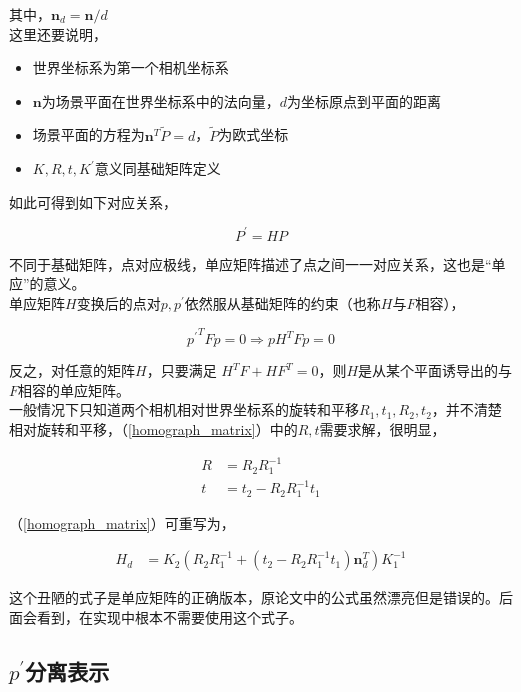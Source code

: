 \documentclass[hpyerref,UTF8,a4paper,titlepage,12pt,oneside]{ctexbook}
\theoremstyle{definition}
\begin{document}
	其中，$\mathbf{n}_d = \mathbf{n}/d$\\

	这里还要说明，
	\begin{itemize}
		\item 世界坐标系为第一个相机坐标系
		\item $\mathbf{n}$为场景平面在世界坐标系中的法向量，$d$为坐标原点到平面的距离
		\item 场景平面的方程为$\mathbf{n}^T \tilde{P} = d$，$\tilde{P}$为欧式坐标
		\item $K,R,t, K^{\prime}$意义同基础矩阵定义
	\end{itemize}

	如此可得到如下对应关系，

	\begin{equation}
		P^{\prime} = HP 
	\end{equation}

	不同于基础矩阵，点对应极线，单应矩阵描述了点之间一一对应关系，这也是“单应”的意义。\\

	单应矩阵$H$变换后的点对$p,p^{\prime}$依然服从基础矩阵的约束（也称$H$与$F$相容），

	$$
		{p^{\prime}}^T F p = 0 \Rightarrow p H^T F p = 0
	$$

	反之，对任意的矩阵$H$，只要满足 $H^TF + HF^T = 0$，则$H$是从某个平面诱导出的与$F$相容的单应矩阵。\\

	一般情况下只知道两个相机相对世界坐标系的旋转和平移$R_1,t_1,R_2, t_2$，并不清楚相对旋转和平移，（\ref{homograph_matrix}）中的$R,t$需要求解，很明显，

	\begin{align*}
		R &= R_2R_1^{-1}\\
		t &= t_2 - R_2R_1^{-1}t_1
	\end{align*}

	（\ref{homograph_matrix}）可重写为，

	\begin{align}
		H_d &= K_2 \left(R_2R_1^{-1} +\left(t_2 - R_2R_1^{-1}t_1\right) \mathbf{n}_d^T\right) K_1^{-1} \label{new_homograph_matrix}
	\end{align}	

	这个丑陋的式子是单应矩阵的正确版本，原论文中的公式虽然漂亮但是错误的。后面会看到，在实现中根本不需要使用这个式子。

\subsection{$p^{\prime}$分离表示}
\end{document}
